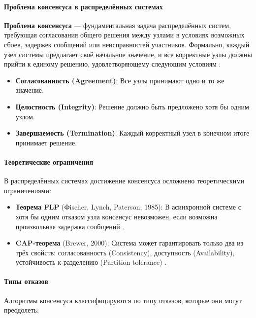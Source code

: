 \paragraph{Проблема консенсуса в распределённых системах}

\textbf{Проблема консенсуса} — фундаментальная задача распределённых систем, требующая согласования общего решения между узлами в условиях возможных сбоев, задержек сообщений или 
неисправностей участников. Формально, каждый узел системы предлагает своё начальное значение, и все корректные узлы должны прийти к единому решению, удовлетворяющему следующим условиям \autocite{Tanenbaum}: 

\begin{itemize} 
    \item \textbf{Согласованность (Agreement)}: Все узлы принимают одно и то же значение. 
    \item \textbf{Целостность (Integrity)}: Решение должно быть предложено хотя бы одним узлом. 
    \item \textbf{Завершаемость (Termination)}: Каждый корректный узел в конечном итоге принимает решение. 
\end{itemize}

\paragraph{Теоретические ограничения} 

В распределённых системах достижение консенсуса осложнено теоретическими ограничениями: 

\begin{itemize} 
    \item \textbf{Теорема FLP} (Фischer, Lynch, Paterson, 1985): В асинхронной системе с хотя бы одним отказом узла консенсус невозможен, если возможна произвольная задержка сообщений \autocite{Fischer1985}. 
    \item \textbf{CAP-теорема} (Brewer, 2000): Система может гарантировать только два из трёх свойств: согласованность (Consistency), доступность (Availability), устойчивость к разделению (Partition tolerance) \autocite{Brewer2012}. 
\end{itemize}

\paragraph{Типы отказов} 

Алгоритмы консенсуса классифицируются по типу отказов, которые они могут преодолеть: 

